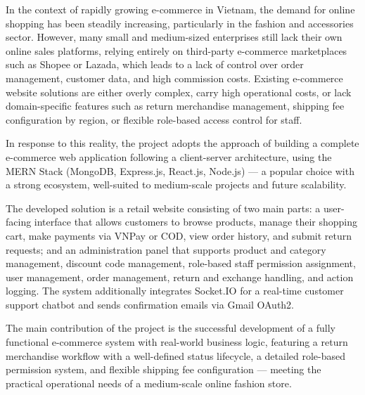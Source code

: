 In the context of rapidly growing e-commerce in Vietnam, the demand for online
shopping has been steadily increasing, particularly in the fashion and accessories
sector. However, many small and medium-sized enterprises still lack their own
online sales platforms, relying entirely on third-party e-commerce marketplaces
such as Shopee or Lazada, which leads to a lack of control over order management,
customer data, and high commission costs. Existing e-commerce website solutions
are either overly complex, carry high operational costs, or lack domain-specific
features such as return merchandise management, shipping fee configuration by
region, or flexible role-based access control for staff.

In response to this reality, the project adopts the approach of building a
complete e-commerce web application following a client-server architecture, using
the MERN Stack (MongoDB, Express.js, React.js, Node.js) — a popular choice with
a strong ecosystem, well-suited to medium-scale projects and future scalability.

The developed solution is a retail website consisting of two main parts: a
user-facing interface that allows customers to browse products, manage their
shopping cart, make payments via VNPay or COD, view order history, and submit
return requests; and an administration panel that supports product and category
management, discount code management, role-based staff permission assignment,
user management, order management, return and exchange handling, and action
logging. The system additionally integrates Socket.IO for a real-time customer
support chatbot and sends confirmation emails via Gmail OAuth2.

The main contribution of the project is the successful development of a fully
functional e-commerce system with real-world business logic, featuring a return
merchandise workflow with a well-defined status lifecycle, a detailed role-based
permission system, and flexible shipping fee configuration — meeting the practical
operational needs of a medium-scale online fashion store.
